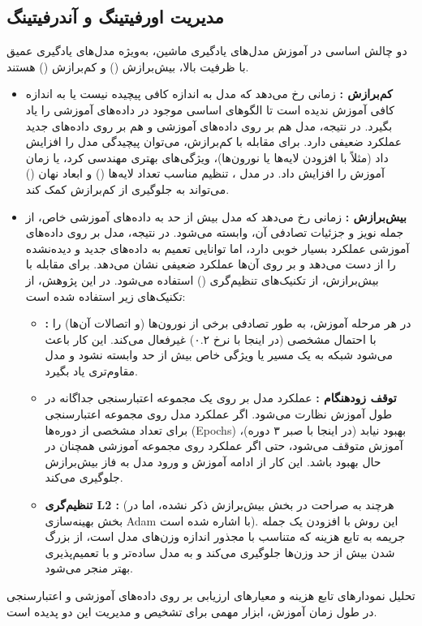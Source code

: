 \subsection{مدیریت اورفیتینگ و آندرفیتینگ}
دو چالش اساسی در آموزش مدل‌های یادگیری ماشین، به‌ویژه مدل‌های یادگیری عمیق با ظرفیت بالا، بیش‌برازش () و کم‌برازش () هستند.

\begin{itemize}
    \item \textbf{کم‌برازش :} زمانی رخ می‌دهد که مدل به اندازه کافی پیچیده نیست یا به اندازه کافی آموزش ندیده است تا الگوهای اساسی موجود در داده‌های آموزشی را یاد بگیرد. در نتیجه، مدل هم بر روی داده‌های آموزشی و هم بر روی داده‌های جدید عملکرد ضعیفی دارد. برای مقابله با کم‌برازش، می‌توان پیچیدگی مدل را افزایش داد (مثلاً با افزودن لایه‌ها یا نورون‌ها)، ویژگی‌های بهتری مهندسی کرد، یا زمان آموزش را افزایش داد. در مدل ، تنظیم مناسب تعداد لایه‌ها () و ابعاد نهان () می‌تواند به جلوگیری از کم‌برازش کمک کند.
    \item \textbf{بیش‌برازش :} زمانی رخ می‌دهد که مدل بیش از حد به داده‌های آموزشی خاص، از جمله نویز و جزئیات تصادفی آن، وابسته می‌شود. در نتیجه، مدل بر روی داده‌های آموزشی عملکرد بسیار خوبی دارد، اما توانایی تعمیم به داده‌های جدید و دیده‌نشده را از دست می‌دهد و بر روی آن‌ها عملکرد ضعیفی نشان می‌دهد. برای مقابله با بیش‌برازش، از تکنیک‌های تنظیم‌گری () استفاده می‌شود. در این پژوهش، از تکنیک‌های زیر استفاده شده است:
    \begin{itemize}
        \item \textbf{:} در هر مرحله آموزش، به طور تصادفی برخی از نورون‌ها (و اتصالات آن‌ها) را با احتمال مشخصی (در اینجا با نرخ ۰.۲) غیرفعال می‌کند. این کار باعث می‌شود شبکه به یک مسیر یا ویژگی خاص بیش از حد وابسته نشود و مدل مقاوم‌تری یاد بگیرد.
        \item \textbf{توقف زودهنگام :} عملکرد مدل بر روی یک مجموعه اعتبارسنجی جداگانه در طول آموزش نظارت می‌شود. اگر عملکرد مدل روی مجموعه اعتبارسنجی برای تعداد مشخصی از دوره‌ها (Epochs) بهبود نیابد (در اینجا با صبر ۳ دوره)، آموزش متوقف می‌شود، حتی اگر عملکرد روی مجموعه آموزشی همچنان در حال بهبود باشد. این کار از ادامه آموزش و ورود مدل به فاز بیش‌برازش جلوگیری می‌کند.
        \item \textbf{تنظیم‌گری L2 :} (هرچند به صراحت در بخش بیش‌برازش ذکر نشده، اما در بخش بهینه‌سازی Adam با  اشاره شده است). این روش با افزودن یک جمله جریمه به تابع هزینه که متناسب با مجذور اندازه وزن‌های مدل است، از بزرگ شدن بیش از حد وزن‌ها جلوگیری می‌کند و به مدل ساده‌تر و با تعمیم‌پذیری بهتر منجر می‌شود.
    \end{itemize}
\end{itemize}
تحلیل نمودارهای تابع هزینه و معیارهای ارزیابی بر روی داده‌های آموزشی و اعتبارسنجی در طول زمان آموزش، ابزار مهمی برای تشخیص و مدیریت این دو پدیده است.

